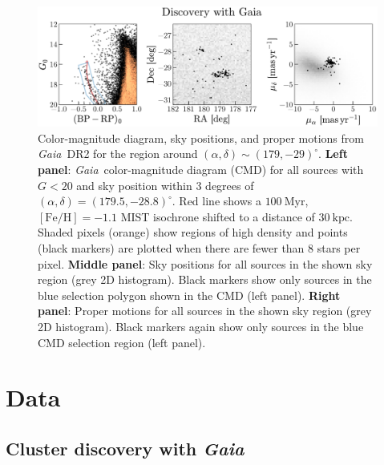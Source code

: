 \documentclass[twocolumn]{aastex62}
\newcommand{\acronym}[1]{{\small{#1}}}
\newcommand{\gaia}{\textsl{Gaia}}
\newcommand{\DR}[1]{\acronym{DR#1}}
\newcommand{\kpc}{\textrm{kpc}}
\newcommand{\feh}{\ensuremath{[\textrm{Fe} / \textrm{H}]}}
\begin{document}
\begin{figure}[htb!]
\centering
\includegraphics[width=\textwidth]{figures/gaia-cmd-pm.pdf}
\caption{Color-magnitude diagram, sky positions, and proper motions from \gaia\ \DR{2} for the region around $(\alpha, \delta) \sim (179, -29)^\circ$.
\textbf{Left panel}: \gaia\ color-magnitude diagram (CMD) for all sources with $G < 20$ and sky position within 3 degrees of $(\alpha, \delta) = (179.5, -28.8)^\circ$.
Red line shows a $100~\textrm{Myr}$, $\feh = -1.1$ \acronym{MIST} isochrone shifted to a distance of $30~\kpc$.
Shaded pixels (orange) show regions of high density and points (black markers) are plotted when there are fewer than 8 stars per pixel.
\textbf{Middle panel}: Sky positions for all sources in the shown sky region (grey 2D histogram).
Black markers show only sources in the blue selection polygon shown in the CMD (left panel).
\textbf{Right panel}: Proper motions for all sources in the shown sky region (grey 2D histogram).
Black markers again show only sources in the blue CMD selection region (left panel).
}
\label{fig:cmds}
\end{figure}

\section{Data} \label{sec:data}

\subsection{Cluster discovery with \gaia}
\label{sec:discovery}
\end{document}
